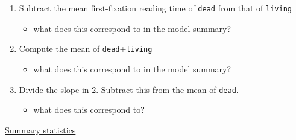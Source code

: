 \documentclass[
  letterpaper,
  DIV=11,
  numbers=noendperiod]{scrartcl}
\providecommand{\tightlist}{%
  \setlength{\itemsep}{0pt}\setlength{\parskip}{0pt}}\usepackage{longtable,booktabs,array}
\begin{document}
\begin{enumerate}
\def\labelenumi{\arabic{enumi}.}
\tightlist
\item
  Subtract the mean first-fixation reading time of \texttt{dead} from
  that of \texttt{living}

  \begin{itemize}
  \tightlist
  \item
    what does this correspond to in the model summary?
  \end{itemize}
\item
  Compute the mean of \texttt{dead}+\texttt{living}

  \begin{itemize}
  \tightlist
  \item
    what does this correspond to in the model summary?
  \end{itemize}
\item
  Divide the slope in 2. Subtract this from the mean of \texttt{dead}.

  \begin{itemize}
  \tightlist
  \item
    what does this correspond to?
  \end{itemize}
\end{enumerate}

\ul{Summary statistics}
\end{document}
